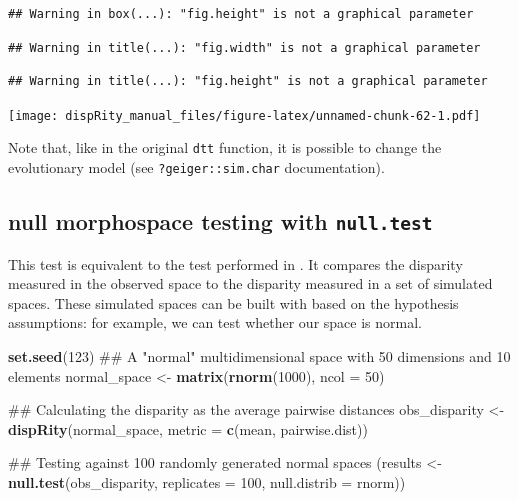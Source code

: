 \documentclass[]{book}
\newenvironment{Shaded}{\begin{snugshade}}{\end{snugshade}}
\newcommand{\KeywordTok}[1]{\textcolor[rgb]{0.13,0.29,0.53}{\textbf{#1}}}
\newcommand{\DataTypeTok}[1]{\textcolor[rgb]{0.13,0.29,0.53}{#1}}
\newcommand{\DecValTok}[1]{\textcolor[rgb]{0.00,0.00,0.81}{#1}}
\newcommand{\StringTok}[1]{\textcolor[rgb]{0.31,0.60,0.02}{#1}}
\newcommand{\NormalTok}[1]{#1}
\theoremstyle{definition}
\theoremstyle{definition}
\theoremstyle{remark}
\begin{document}
\begin{verbatim}
## Warning in box(...): "fig.height" is not a graphical parameter
\end{verbatim}

\begin{verbatim}
## Warning in title(...): "fig.width" is not a graphical parameter
\end{verbatim}

\begin{verbatim}
## Warning in title(...): "fig.height" is not a graphical parameter
\end{verbatim}

\texttt{[image: dispRity\_manual\_files/figure-latex/unnamed-chunk-62-1.pdf]}

Note that, like in the original \texttt{dtt} function, it is possible to
change the evolutionary model (see \texttt{?geiger::sim.char}
documentation).

\subsection{\texorpdfstring{null morphospace testing with
\texttt{null.test}}{null morphospace testing with null.test}}\label{null-morphospace-testing-with-null.test}

This test is equivalent to the test performed in \citet{diaz2016global}.
It compares the disparity measured in the observed space to the
disparity measured in a set of simulated spaces. These simulated spaces
can be built with based on the hypothesis assumptions: for example, we
can test whether our space is normal.

\begin{Shaded}
\begin{Highlighting}[]
\KeywordTok{set.seed}\NormalTok{(}\DecValTok{123}\NormalTok{)}
\NormalTok{## A "normal" multidimensional space with 50 dimensions and 10 elements}
\NormalTok{normal_space <-}\StringTok{ }\KeywordTok{matrix}\NormalTok{(}\KeywordTok{rnorm}\NormalTok{(}\DecValTok{1000}\NormalTok{), }\DataTypeTok{ncol =} \DecValTok{50}\NormalTok{)}

\NormalTok{## Calculating the disparity as the average pairwise distances}
\NormalTok{obs_disparity <-}\StringTok{ }\KeywordTok{dispRity}\NormalTok{(normal_space, }\DataTypeTok{metric =} \KeywordTok{c}\NormalTok{(mean, pairwise.dist))}

\NormalTok{## Testing against 100 randomly generated normal spaces}
\NormalTok{(results <-}\StringTok{ }\KeywordTok{null.test}\NormalTok{(obs_disparity, }\DataTypeTok{replicates =} \DecValTok{100}\NormalTok{, }\DataTypeTok{null.distrib =}\NormalTok{ rnorm))}
\end{Highlighting}
\end{Shaded}
\end{document}
